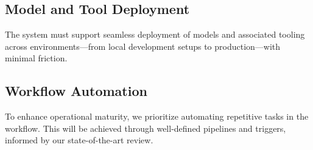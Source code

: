 \subsection{Model and Tool Deployment}\label{subsec:model-and-tool-deployment}
The system must support seamless deployment of models and associated tooling across environments—from local development
setups to production—with minimal friction.

\subsection{Workflow Automation}\label{subsec:workflow-automation}
To enhance operational maturity, we prioritize automating repetitive tasks in the workflow.
This will be achieved through well-defined pipelines and triggers, informed by our state-of-the-art review.